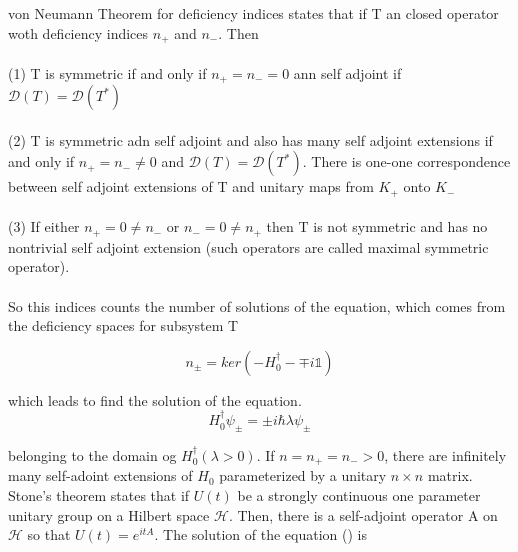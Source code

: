 \documentclass[12pt, letterpaper]{article}
\newcommand*{\1}{\hspace{1pt}}
\begin{document}
        von Neumann Theorem for deficiency indices states that if T an closed operator woth deficiency indices $n_{+}$ and $n_{-}$. Then \\ 
        \\
         (1) T is symmetric if and only if $n_{+} = n_{-} = 0$ ann self adjoint if $\mathcal{D}(T)=\mathcal{D}(T^{*})$ \\ 
         \\ 
         (2) T is symmetric adn self adjoint and also has many self adjoint extensions if and only if $n_{+}=n_{-}\neq 0$ and  $\mathcal{D}(T)=\mathcal{D}(T^{*})$.
         There is one-one correspondence between self adjoint extensions of T and unitary maps from $K_{+}$ onto $K_{-}$ \\ 
         \\ 
         (3) If either $n_{+}=0 \neq n_{-}$ or $n_{-}=0 \neq n_{+}$ then T is not symmetric and has no nontrivial self adjoint extension (such operators are called 
         maximal symmetric operator). \\
         \\
        So this indices counts the number of solutions of the equation, which comes from the deficiency spaces for subsystem T

        \begin{equation}
            n_{\pm} = ker \left(-H_{0}^{\dagger} - \mp i \mathds{1}\right)
        \end{equation}

        which leads to find the solution of the equation.
        \begin{equation}
            H_{0} ^{\dagger} \psi_{\pm} = \pm i \hbar \lambda \psi_{\pm}
        \end{equation}

        belonging to the domain og $H_{0}^{\dagger}(\lambda>0)$. If $n=n_{+}=n_{-}>0$, there are infinitely many self-adoint extensions of $H_{0}$ parameterized by a 
        unitary $n\times n$ matrix. Stone's theorem states that if $U(t)$ be a strongly continuous one parameter unitary group on a Hilbert space $\mathcal{H}$. 
        Then, there is a self-adjoint operator A on $\mathcal{H}$ so that $U(t) = e^{itA}$. The solution of the equation () is 
\end{document}
